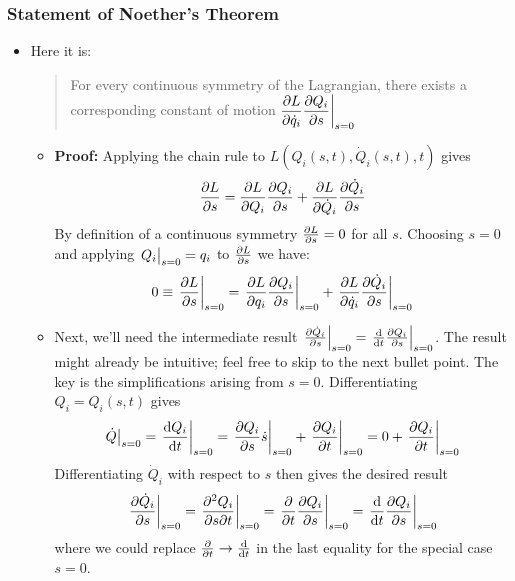 \documentclass[11pt, a4paper]{article}
\begin{document}
\subsubsection{Statement of Noether's Theorem}	
\begin{itemize}
	\item  Here it is:
	\begin{quote}
		For every continuous symmetry of the Lagrangian, there exists a corresponding constant of motion $ \displaystyle{\pdv{L}{\dot{q}_i} \pdv{Q_i}{s} \bigg |_{s=0}} $
	\end{quote}
	\begin{itemize}
		\item \textbf{Proof:} Applying the chain rule to $ L\left (Q_i(s, t), \dot{Q}_i(s, t), t\right ) $ gives
		\begin{equation*}
			\pdv{L}{s} = \pdv{L}{Q_{i}} \pdv{Q_{i}}{s} + \pdv{L}{\dot{Q}_{i}} \pdv{\dot{Q}_{i}}{s}
		\end{equation*}
		By definition of a continuous symmetry $ \pdv{L}{s} = 0 $ for all $ s $. Choosing $ s = 0 $ and applying $ \eval{Q_{i}}_{s=0} = q_{i} $ to $ \pdv{L}{s} $ we have:
		\begin{equation*}
			0 \equiv \eval{\pdv{L}{s}}_{s=0} = \eval{\pdv{L}{q_{i}} \pdv{Q_{i}}{s}}_{s=0} + \eval{\pdv{L}{\dot{q}_{i}} \pdv{\dot{Q}_{i}}{s}}_{s=0}
		\end{equation*}
		
		\item Next, we'll need the intermediate result $ \eval{\pdv{\dot{Q}_{i}}{s}}_{s=0} = \eval{\dv{}{t}\pdv{Q_{i}}{s}}_{s=0} $. The result might already be intuitive; feel free to skip to the next bullet point. The key is the simplifications arising from $ s =0 $. Differentiating $ Q_{i} = Q_{i}(s, t) $ gives
		\begin{equation*}
			\dot{Q}\big|_{s=0} = \eval{\dv{Q_{i}}{t}}_{s=0} = \eval{\pdv{Q_{i}}{s}\dot{s}}_{s=0} + \eval{\pdv{Q_{i}}{t}}_{s=0} = 0 + \eval{\pdv{Q_{i}}{t}}_{s=0}
		\end{equation*}
		Differentiating $ \dot{Q}_{i} $ with respect to $ s $ then gives the desired result
		\begin{equation*}
			\eval{\pdv{\dot{Q}_{i}}{s}}_{s=0} = \eval{\pdv{Q_{i}}{s}{t}}_{s=0} = \eval{\pdv{}{t}\pdv{Q_{i}}{s}}_{s=0} = \eval{\dv{}{t}\pdv{Q_{i}}{s}}_{s=0}
		\end{equation*}
		where we could replace $ \pdv{}{t} \to \dv{}{t}$ in the last equality for the special case $ s = 0 $.
			

\end{itemize}
\end{itemize}
\end{document}
